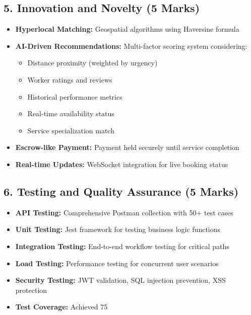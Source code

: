 \documentclass[12pt,a4paper]{article}
\begin{document}
\subsection*{5. Innovation and Novelty (5 Marks)}
\begin{itemize}[leftmargin=*]
    \item \textbf{Hyperlocal Matching:} Geospatial algorithms using Haversine formula
    \item \textbf{AI-Driven Recommendations:} Multi-factor scoring system considering:
    \begin{itemize}
        \item Distance proximity (weighted by urgency)
        \item Worker ratings and reviews
        \item Historical performance metrics
        \item Real-time availability status
        \item Service specialization match
    \end{itemize}
    \item \textbf{Escrow-like Payment:} Payment held securely until service completion
    \item \textbf{Real-time Updates:} WebSocket integration for live booking status
\end{itemize}

\subsection*{6. Testing and Quality Assurance (5 Marks)}
\begin{itemize}[leftmargin=*]
    \item \textbf{API Testing:} Comprehensive Postman collection with 50+ test cases
    \item \textbf{Unit Testing:} Jest framework for testing business logic functions
    \item \textbf{Integration Testing:} End-to-end workflow testing for critical paths
    \item \textbf{Load Testing:} Performance testing for concurrent user scenarios
    \item \textbf{Security Testing:} JWT validation, SQL injection prevention, XSS protection
    \item \textbf{Test Coverage:} Achieved 75%
\end{itemize}
\end{document}
